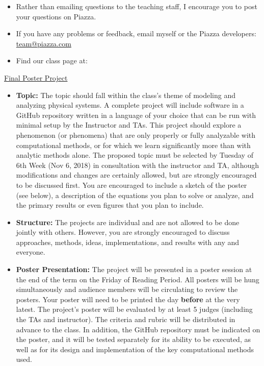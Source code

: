 \begin{itemize}

  \item Rather than emailing questions to the teaching staff, I encourage you to post your questions on Piazza. 

  \item If you have any problems or feedback, email myself or the Piazza developers: \href{mailto:team@piazza.com}{team@piazza.com}

  \item Find our class page at: \PiazzaLink
  
\end{itemize}  


\noindent \underline{Final Poster Project}

\begin{itemize}

  \item \textbf{Topic:} The topic should fall within the class's theme of modeling and analyzing physical systems. A complete project will include software in a GitHub repository written in a language of your choice that can be run with minimal setup by the Instructor and TAs. This project should explore a phenomenon (or phenomena) that are only properly or fully analyzable with computational methods, or for which we learn significantly more than with analytic methods alone. The proposed topic must be selected by Tuesday of 6th Week (Nov 6, 2018) in consultation with the instructor and TA, although modifications and changes are certainly allowed, but are strongly encouraged to be discussed first. You are encouraged to include a sketch of the poster (see below), a description of the equations you plan to solve or analyze, and the primary results or even figures that you plan to include.

  \item \textbf{Structure:} The projects are individual and are not allowed to be done jointly with others. However, you are strongly encouraged to discuss approaches, methods, ideas, implementations, and results with any and everyone.

  \item \textbf{Poster Presentation:} The project will be presented in a poster session at the end of the term on the Friday of Reading Period. All posters will be hung simultaneously and audience members will be circulating to review the posters. Your poster will need to be printed the day \textbf{before} at the very latest. The project's poster will be evaluated by at least 5 judges (including the TAs and instructor). The criteria and rubric will be distributed in advance to the class. In addition, the GitHub repository must be indicated on the poster, and it will be tested separately for its ability to be executed, as well as for its design and implementation of the key computational methods used. 
  
\end{itemize}  

